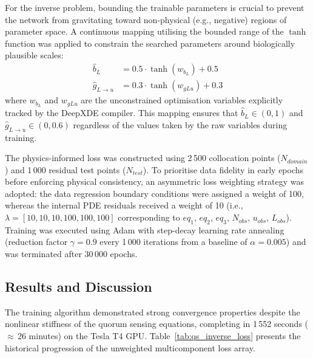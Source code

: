 \documentclass[14pt,a4paper,openany]{extbook}
\begin{document}
For the inverse problem, bounding the trainable parameters is crucial to prevent the network from gravitating toward non-physical (e.g., negative) regions of parameter space. A continuous mapping utilising the bounded range of the $\tanh$ function was applied to constrain the searched parameters around biologically plausible scales:
\begin{align}
\hat{b}_L &= 0.5 \cdot \tanh(w_{b_L}) + 0.5 \label{eq:bound_bl} \\
\hat{g}_{L\to u} &= 0.3 \cdot \tanh(w_{gLu}) + 0.3 \label{eq:bound_glu}
\end{align}
where $w_{b_L}$ and $w_{gLu}$ are the unconstrained optimisation variables explicitly tracked by the DeepXDE compiler. This mapping ensures that $\hat{b}_L \in (0, 1)$ and $\hat{g}_{L \to u} \in (0, 0.6)$ regardless of the values taken by the raw variables during training.

The physics-informed loss was constructed using 2\,500 collocation points ($N_{domain}$) and 1\,000 residual test points ($N_{test}$). To prioritise data fidelity in early epochs before enforcing physical consistency, an asymmetric loss weighting strategy was adopted: the data regression boundary conditions were assigned a weight of 100, whereas the internal PDE residuals received a weight of 10 (i.e., $\lambda = [10, 10, 10, 100, 100, 100]$ corresponding to $eq_1$, $eq_2$, $eq_3$, $N_{obs}$, $u_{obs}$, $L_{obs}$). Training was executed using Adam with step-decay learning rate annealing (reduction factor $\gamma = 0.9$ every 1\,000 iterations from a baseline of $\alpha = 0.005$) and was terminated after 30\,000 epochs.

\subsection{Results and Discussion}
\label{subsec:qs_inverse_results}

The training algorithm demonstrated strong convergence properties despite the nonlinear stiffness of the quorum sensing equations, completing in 1\,552 seconds ($\approx$\,26 minutes) on the Tesla T4 GPU. Table~\ref{tab:qs_inverse_loss} presents the historical progression of the unweighted multicomponent loss array.
\end{document}
